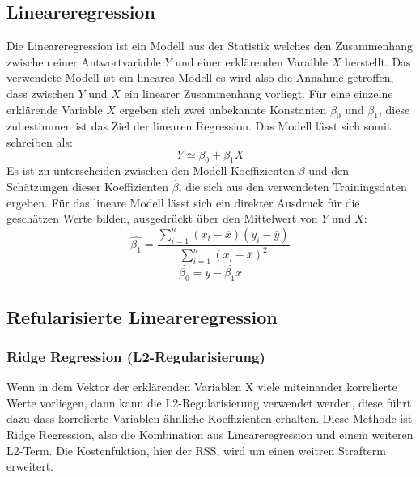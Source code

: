 \subsection{Lineareregression}
Die Lineareregression ist ein Modell aus der Statistik welches den Zusammenhang zwischen einer Antwortvariable \(Y\) und einer erklärenden Varaible \(X\) herstellt. Das verwendete Modell ist ein lineares Modell es wird also die Annahme getroffen, dass zwischen \(Y\) und \(X\) ein linearer Zusammenhang vorliegt. Für eine einzelne erklärende Variable \(X\) ergeben sich zwei unbekannte Konstanten \(\beta_0\) und \(\beta_1\), diese zubestimmen ist das Ziel der linearen Regression. Das Modell lässt sich somit schreiben als:
\begin{equation}
    Y \simeq \beta_0 + \beta_1 X
    \label{eq:linreg1}
\end{equation}
Es ist zu unterscheiden zwischen den Modell Koeffizienten \(\beta\) und den Schätzungen dieser Koeffizienten \(\hat{\beta}\), die sich aus den verwendeten Trainingsdaten ergeben. 
Für das lineare Modell lässt sich ein direkter Ausdruck für die geschätzen Werte bilden, ausgedrückt über den Mittelwert von \(Y\) und \(X\):
\begin{equation}
    \hat{\beta_1} = \frac{\sum_{i=1}^{n}(x_i - \overline{x})(y_i - \overline{y})}{\sum_{i=1}^{n}(x_i - \overline{x})^2}
\end{equation}
\begin{equation}
    \hat{\beta_0} = \overline{y} - \hat{\beta_1}\overline{x}
\end{equation}

\cite{james2013}

\subsection{Refularisierte Lineareregression}

\subsubsection{Ridge Regression (L2-Regularisierung)}
Wenn in dem Vektor der erklärenden Variablen X viele miteinander korrelierte Werte vorliegen, dann kann die L2-Regularisierung verwendet werden, diese führt dazu dass korrelierte Variablen ähnliche Koeffizienten erhalten. Diese Methode ist Ridge Regression, also die Kombination aus Lineareregression und einem weiteren L2-Term. Die Kostenfuktion, hier der RSS, wird um einen weitren Strafterm erweitert.


